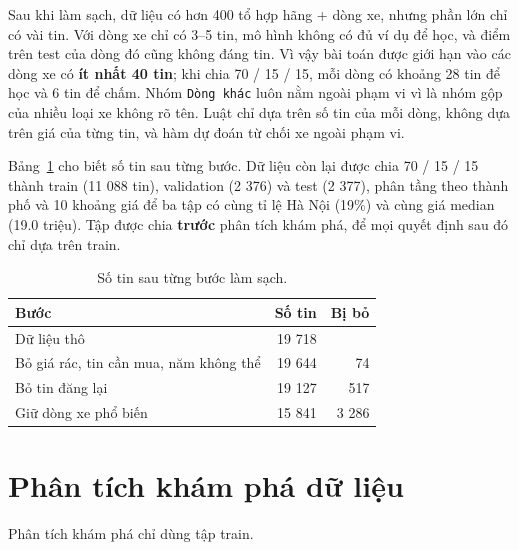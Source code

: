 Sau khi làm sạch, dữ liệu có hơn 400 tổ hợp hãng + dòng xe, nhưng phần lớn chỉ có vài tin. Với dòng xe chỉ có 3--5
tin, mô hình không có đủ ví dụ để học, và điểm trên test của dòng đó cũng không đáng tin. Vì vậy bài toán được giới hạn
vào các dòng xe có \textbf{ít nhất 40 tin}; khi chia 70 / 15 / 15, mỗi dòng có khoảng 28 tin để học và 6 tin để chấm.
Nhóm \texttt{Dòng khác} luôn nằm ngoài phạm vi vì là nhóm gộp của nhiều loại xe không rõ tên. Luật chỉ dựa trên số tin
của mỗi dòng, không dựa trên giá của từng tin, và hàm dự đoán từ chối xe ngoài phạm vi.


Bảng~\ref{tab:tab-funnel} cho biết số tin sau từng bước. Dữ liệu còn lại được chia 70 / 15 / 15 thành train (11 088
tin), validation (2 376) và test (2 377), phân tầng theo thành phố và 10 khoảng giá để ba tập có cùng tỉ lệ Hà Nội
(19\%) và cùng giá median (19.0 triệu). Tập được chia \textbf{trước} phân tích khám phá, để mọi quyết định sau đó chỉ dựa
trên train.

\begin{table}[H]\centering
\caption{Số tin sau từng bước làm sạch.}\label{tab:tab-funnel}
\begin{tabular}{lrr}
\toprule
Bước & Số tin & Bị bỏ \\
\midrule
Dữ liệu thô & 19 718 & \\
Bỏ giá rác, tin cần mua, năm không thể & 19 644 & 74 \\
Bỏ tin đăng lại & 19 127 & 517 \\
Giữ dòng xe phổ biến & 15 841 & 3 286 \\
\bottomrule
\end{tabular}
\end{table}

\section{Phân tích khám phá dữ liệu}

Phân tích khám phá chỉ dùng tập train.


